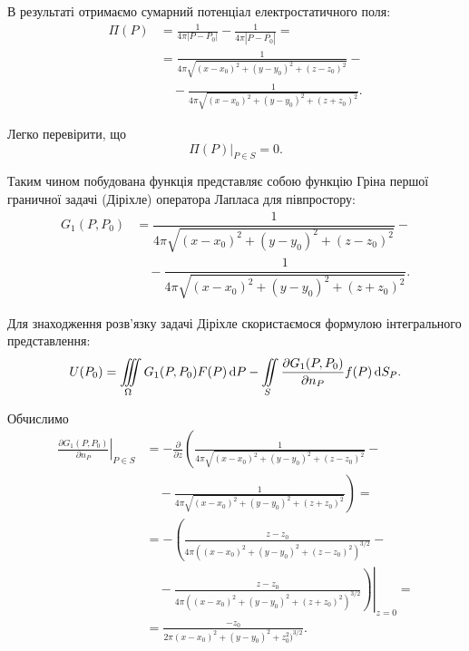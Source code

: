 В результаті отримаємо сумарний потенціал електростатичного поля:
\begin{equation}
	\begin{aligned}
		\Pi(P) &= \frac{1}{4 \pi |P - P_0|} - \frac{1}{4 \pi |P - \overline{P_0}|} = \\
		& = \frac{1}{4 \pi \sqrt{(x - x_0)^2 + (y - y_0)^2 + (z - z_0)^2}} - \\
		& \quad - \frac{1}{4 \pi \sqrt{(x - x_0)^2 + (y - y_0)^2 + (z + z_0)^2}}.
	\end{aligned}
\end{equation}

Легко перевірити, що 
\begin{equation}
	\left. \Pi(P) \right|_{P \in S} = 0.
\end{equation}

Таким чином побудована функція представляє собою функцію Гріна першої граничної задачі (Діріхле) оператора Лапласа для півпростору:
\begin{equation}
	\begin{aligned}
		G_1(P, P_0) &= \dfrac{1}{4 \pi \sqrt{(x - x_0)^2 + (y - y_0)^2 + (z - z_0)^2}} - \\
		& \quad - \dfrac{1}{4 \pi \sqrt{(x - x_0)^2 + (y - y_0)^2 + (z + z_0)^2}}.
	\end{aligned}
\end{equation}

Для знаходження розв'язку задачі Діріхле скористаємося формулою інтегрального представлення:
\begin{equation}
	U(P_0) = \displaystyle\iiint\limits_\Omega G_1(P, P_0) F(P) \mathop{}\!\mathrm{d} P - \displaystyle\iint\limits_S \frac{\partial G_1(P, P_0)}{\partial n_P} f(P) \mathop{}\!\mathrm{d} S_P.
\end{equation}

Обчислимо
\begin{equation}
	\begin{aligned}
		\left. \frac{\partial G_1(P, P_0)}{\partial n_P} \right|_{P \in S} &= - \frac{\partial}{\partial z} \left( \frac{1}{4 \pi \sqrt{(x - x_0)^2 + (y - y_0)^2 + (z - z_0)^2}} \right.- \\
		& \quad - \left. \frac{1}{4 \pi \sqrt{(x - x_0)^2 + (y - y_0)^2 + (z + z_0)^2}} \right) = \\
		& = - \left( \frac{z - z_0}{4 \pi ((x - x_0)^2 + (y - y_0)^2 + (z - z_0)^2)^{3/2}} \right. - \\
		& \quad - \left. \left. \frac{z - z_0}{4 \pi ((x - x_0)^2 + (y - y_0)^2 + (z + z_0)^2)^{3/2}} \right) \right|_{z = 0} = \\
		& = \frac{-z_0}{2 \pi (x - x_0)^2 + (y - y_0)^2 + z_0^2)^{3 / 2}}.
	\end{aligned}
\end{equation}

